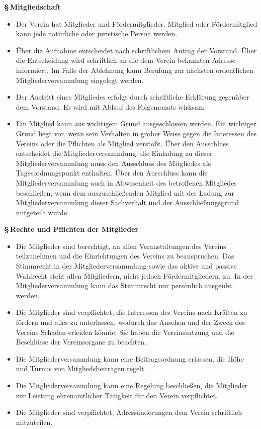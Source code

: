 \documentclass[11pt]{article}
\def\items#1{{%
  \itcounter0%
  \begin{itemize}
  #1
  \end{itemize}
}}
\let\it\item%
\def\item{
  \advance\itcounter1%
  \it[(\the\itcounter)]
}
\def\paragraf#1{
  \advance\itcounter1%
  \par\medskip
  {\large\bfseries \S\,\the\itcounter\quad#1}
  \par\smallskip
}
\begin{document}
\paragraf{Mitgliedschaft}

\items{
   \item Der Verein hat Mitglieder und F{\"o}rdermitglieder. Mitglied oder
   F{\"o}rdermitglied kann jede nat\"urliche oder juristische Person werden.
   \item {\"U}ber die Aufnahme entscheidet nach schriftlichem Antrag der Vorstand.
       {\"U}ber die Entscheidung wird schriftlich an die dem Verein bekannten Adresse informiert.
       Im Falle der Ablehnung kann Berufung zur n{\"a}chsten
       ordentlichen Mitgliederversammlung eingelegt werden.
   \item Der Austritt eines Mitgliedes erfolgt durch schriftliche Erkl{\"a}rung gegen{\"u}ber
       dem Vorstand. Er wird mit Ablauf des Folgemonats wirksam.
   \item Ein Mitglied kann aus wichtigem Grund ausgeschlossen werden. Ein
       wichtiger Grund liegt vor, wenn sein Verhalten in grober Weise gegen die
       Interessen des Vereins oder die Pflichten als Mitglied verst{\"o}{\ss}t.
       {\"U}ber den Ausschluss entscheidet die Mitgliederversammlung;
       die Einladung zu dieser Mitgliederversammlung muss den Ausschluss des
       Mitgliedes als Tagesordnungspunkt enthalten.
       {\"U}ber den Ausschluss kann die Mitgliederversammlung auch in
       Abwesenheit des betroffenen Mitgliedes beschlie{\ss}en, wenn
       dem auszuschlie{\ss}enden Mitglied mit der Ladung zur Mitgliederversammlung
       dieser Sachverhalt und der Ausschlie{\ss}ungsgrund
       mitgeteilt wurde.
}

\paragraf{Rechte und Pflichten der Mitglieder}

\items{
   \item Die Mitglieder sind berechtigt, an allen Veranstaltungen des Vereins
       teilzunehmen und die Einrichtungen des Vereins zu beanspruchen. Das
       Stimmrecht in der Mitgliederversammlung sowie das aktive und passive
       Wahlrecht steht allen Mitgliedern, nicht jedoch F{\"o}rdermitgliedern, zu.
       In der Mitgliederversammlung kann das Stimmrecht nur pers{\"o}nlich ausge{\"u}bt werden.
   \item Die Mitglieder sind verpflichtet, die Interessen des Vereins nach Kr{\"a}ften zu
       f{\"o}rdern und alles zu unterlassen, wodurch das Ansehen und der Zweck des
       Vereins Schaden erleiden k{\"o}nnte. Sie haben die Vereinssatzung und die
       Beschl{\"u}sse der Vereinsorgane zu beachten.
   \item Die Mitgliederversammlung kann eine Beitragsordnung erlassen, die H{\"o}he und
       Turnus von Mitgliedsbeitr{\"a}gen regelt.
   \item Die Mitgliederversammlung kann eine Regelung beschlie{\ss}en, die Mitglieder
       zur Leistung ehrenamtlicher T{\"a}tigkeit f{\"u}r den Verein verpflichtet.
   \item Die Mitglieder sind verpflichtet, Adress{\"a}nderungen dem Verein schriftlich mitzuteilen.
}
\end{document}
